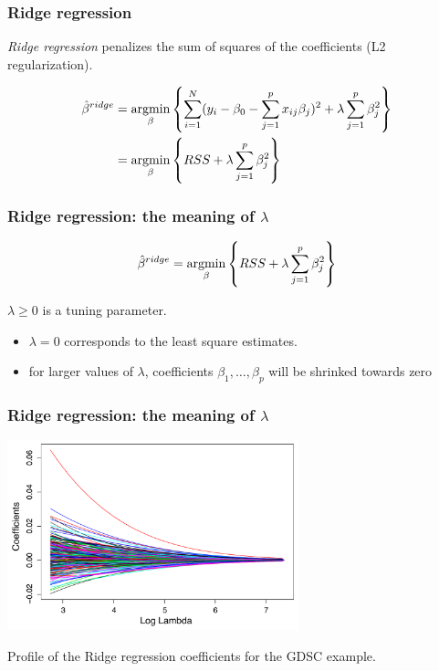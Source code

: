 \documentclass[notes]{beamer}          %
\newcommand{\argmin}{\operatornamewithlimits{argmin}}
\begin{document}
\begin{frame}
\frametitle{Ridge regression}
\textit{Ridge regression} penalizes the sum of squares of the coefficients (L2 regularization). 

\begin{align*}
\hat{\beta}^{ridge} &= \argmin_{\beta} \left\{ \sum_{i=1}^N (y_i - \beta_0 -  \sum_{j=1}^p x_{ij}\beta_j)^2 + \lambda \sum_{j=1}^p \beta_j^2 \right\} \\
& =  \argmin_{\beta} \left\{ RSS + \lambda \sum_{j=1}^p \beta_j^2 \right\}
\end{align*}

\end{frame}


\begin{frame}
\frametitle{Ridge regression: the meaning of $\lambda$}

\begin{equation*}
    \hat{\beta}^{ridge} =  \argmin_{\beta} \left\{ RSS + \lambda \sum_{j=1}^p \beta_j^2 \right\}
\end{equation*}

$\lambda \geq 0$ is a tuning parameter.

\begin{itemize}
    \item $\lambda = 0$ corresponds to the least square estimates.
    \item for larger values of $\lambda$, coefficients $\beta_1, \dots, \beta_p$ will be shrinked towards zero
\end{itemize}
\end{frame}

\begin{frame}
\frametitle{Ridge regression: the meaning of $\lambda$}


\begin{center}

\includegraphics[height=5.5cm]{../figures/week_2_linear_models/Ridge_regression_coefficinets.pdf}
\end{center}

Profile of the Ridge regression coefficients for the GDSC example.

\end{frame}
\end{document}
